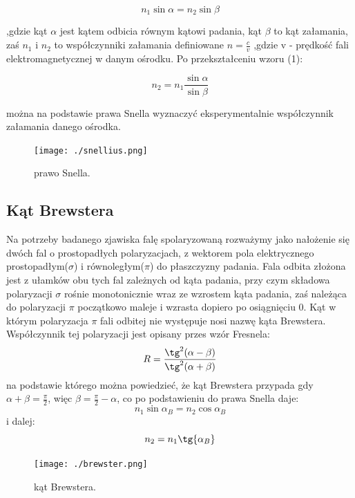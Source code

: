 \documentclass[a4paper,10pt]{article}
\begin{document}
\begin{equation}
n_1\sin{\alpha} = n_2\sin{\beta}
\end{equation}

,gdzie kąt $\alpha$ jest kątem odbicia równym kątowi padania, kąt $\beta$ to kąt załamania, zaś $n_1$ i $n_2$ to współczynniki załamania definiowane $n = \frac{c}{v}$ ,gdzie v - prędkość fali elektromagnetycznej w danym ośrodku. Po przekształceniu wzoru (1):

\begin{equation}
n_2 = n_1 \frac{\sin{\alpha}}{\sin{\beta}}
\end{equation}

można na podstawie prawa Snella wyznaczyć eksperymentalnie współczynnik załamania danego ośrodka.

\begin{figure}[H]
\centering
\texttt{[image: ./snellius.png]}
  \caption{prawo Snella.}
  \label{}
\end{figure}

\subsection{Kąt Brewstera}
Na potrzeby badanego zjawiska falę spolaryzowaną rozważymy jako nałożenie się dwóch fal o prostopadłych polaryzacjach, z wektorem pola elektrycznego prostopadłym($\sigma$) i równoległym($\pi$) do płaszczyzny padania. Fala odbita złożona jest z ułamków obu tych fal zależnych od kąta padania, przy czym składowa polaryzacji $\sigma$ rośnie monotonicznie wraz ze wzrostem kąta padania, zaś należąca do polaryzacji $\pi$
początkowo maleje i wzrasta dopiero po osiągnięciu 0. Kąt w którym polaryzacja $\pi$ fali odbitej nie występuje nosi nazwę kąta Brewstera.
Współczynnik tej polaryzacji jest opisany przes wzór Fresnela:
\begin{equation}
  R = \frac{\tg^2({\alpha - \beta})}{\tg^2({\alpha + \beta})}
\end{equation}
na podstawie którego można powiedzieć, że kąt Brewstera przypada gdy $\alpha + \beta=\frac{\pi}{2}$, więc $\beta = \frac{\pi}{2}-\alpha$, co
po podstawieniu do prawa Snella daje:
\begin{equation}
  n_1 \sin{\alpha_B} = n_2 \cos{\alpha_B}
\end{equation}
i dalej:
\begin{equation}
  n_2 = n_1 \tg{\alpha_B}
\end{equation}

\begin{figure}[H]
\centering
\texttt{[image: ./brewster.png]}
  \caption{kąt Brewstera.}
  \label{}
\end{figure}
\end{document}

